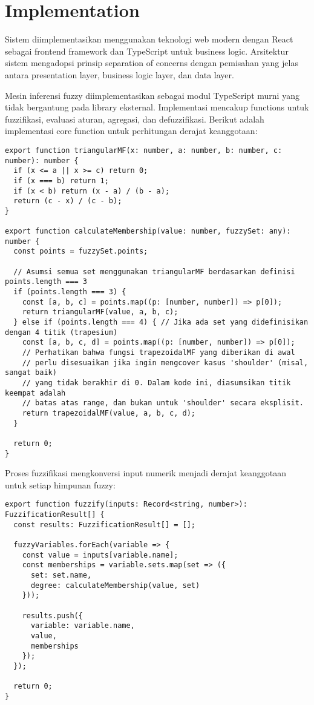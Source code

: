\documentclass{article}
\begin{document}
\section{Implementation}

Sistem diimplementasikan menggunakan teknologi web modern dengan React sebagai frontend framework dan TypeScript untuk business logic. Arsitektur sistem mengadopsi prinsip separation of concerns dengan pemisahan yang jelas antara presentation layer, business logic layer, dan data layer.

Mesin inferensi fuzzy diimplementasikan sebagai modul TypeScript murni yang tidak bergantung pada library eksternal. Implementasi mencakup functions untuk fuzzifikasi, evaluasi aturan, agregasi, dan defuzzifikasi. Berikut adalah implementasi core function untuk perhitungan derajat keanggotaan:

\begin{verbatim}
export function triangularMF(x: number, a: number, b: number, c: number): number {
  if (x <= a || x >= c) return 0;
  if (x === b) return 1;
  if (x < b) return (x - a) / (b - a);
  return (c - x) / (c - b);
}

export function calculateMembership(value: number, fuzzySet: any): number {
  const points = fuzzySet.points;
  
  // Asumsi semua set menggunakan triangularMF berdasarkan definisi points.length === 3
  if (points.length === 3) {
    const [a, b, c] = points.map((p: [number, number]) => p[0]);
    return triangularMF(value, a, b, c);
  } else if (points.length === 4) { // Jika ada set yang didefinisikan dengan 4 titik (trapesium)
    const [a, b, c, d] = points.map((p: [number, number]) => p[0]);
    // Perhatikan bahwa fungsi trapezoidalMF yang diberikan di awal
    // perlu disesuaikan jika ingin mengcover kasus 'shoulder' (misal, sangat baik)
    // yang tidak berakhir di 0. Dalam kode ini, diasumsikan titik keempat adalah
    // batas atas range, dan bukan untuk 'shoulder' secara eksplisit.
    return trapezoidalMF(value, a, b, c, d);
  }
  
  return 0;
}
\end{verbatim}

Proses fuzzifikasi mengkonversi input numerik menjadi derajat keanggotaan untuk setiap himpunan fuzzy:

\begin{verbatim}
export function fuzzify(inputs: Record<string, number>): FuzzificationResult[] {
  const results: FuzzificationResult[] = [];
  
  fuzzyVariables.forEach(variable => {
    const value = inputs[variable.name];
    const memberships = variable.sets.map(set => ({
      set: set.name,
      degree: calculateMembership(value, set)
    }));
    
    results.push({
      variable: variable.name,
      value,
      memberships
    });
  });
  
  return 0;
}
\end{verbatim}
\end{document}
